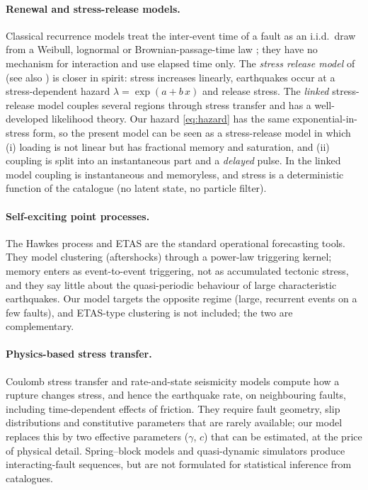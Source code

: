 \documentclass[10pt,a4paper]{article}
\begin{document}
\paragraph{Renewal and stress-release models.}
Classical recurrence models treat the inter-event time of a fault as an i.i.d.\ draw from a Weibull, lognormal or Brownian-passage-time law \citep{Matthews2002}; they have no mechanism for interaction and use elapsed time only. The \emph{stress release model} of \citet{VereJones1978} (see also \citealp{ZhengVereJones1991}) is closer in spirit: stress increases linearly, earthquakes occur at a stress-dependent hazard $\lambda=\exp(a+b\,x)$ and release stress. The \emph{linked} stress-release model couples several regions through stress transfer \citep{LuVereJones2000,Bebbington2003} and has a well-developed likelihood theory. Our hazard \eqref{eq:hazard} has the same exponential-in-stress form, so the present model can be seen as a stress-release model in which (i) loading is not linear but has fractional memory and saturation, and (ii) coupling is split into an instantaneous part and a \emph{delayed} pulse. In the linked model coupling is instantaneous and memoryless, and stress is a deterministic function of the catalogue (no latent state, no particle filter).

\paragraph{Self-exciting point processes.}
The Hawkes process and ETAS \citep{Hawkes1971,Ogata1988} are the standard operational forecasting tools. They model clustering (aftershocks) through a power-law triggering kernel; memory enters as event-to-event triggering, not as accumulated tectonic stress, and they say little about the quasi-periodic behaviour of large characteristic earthquakes. Our model targets the opposite regime (large, recurrent events on a few faults), and ETAS-type clustering is not included; the two are complementary.

\paragraph{Physics-based stress transfer.}
Coulomb stress transfer \citep{Stein1999} and rate-and-state seismicity models \citep{Dieterich1994} compute how a rupture changes stress, and hence the earthquake rate, on neighbouring faults, including time-dependent effects of friction. They require fault geometry, slip distributions and constitutive parameters that are rarely available; our model replaces this by two effective parameters ($\gamma$, $c$) that can be estimated, at the price of physical detail. Spring--block models \citep{BurridgeKnopoff1967} and quasi-dynamic simulators produce interacting-fault sequences, but are not formulated for statistical inference from catalogues.
\end{document}
